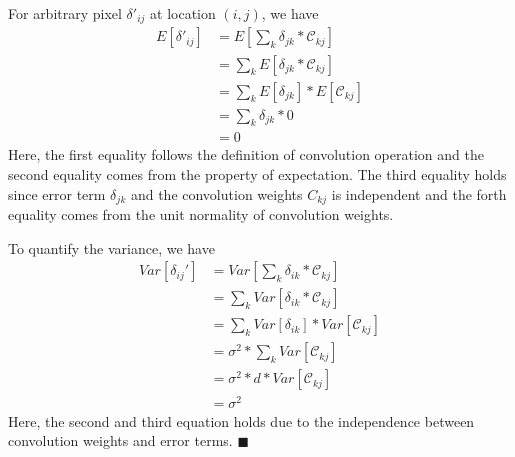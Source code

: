 \documentclass[titlepage]{article}
\newcommand*{\QEDA}{\hfill\ensuremath{\blacksquare}}
\begin{document}
For arbitrary pixel $\delta'_{ij}$ at location $(i,j)$, we have 
\begin{equation}
    \begin{aligned}
        E [\mathcal{\delta'}_{ij}] &= E [\sum_{k}\mathcal{\delta}_{jk} * \mathcal{C}_{kj}] \\
                                 &= \sum_{k} E [\mathcal{\delta}_{jk} * \mathcal{C}_{kj}] \\ 
                                 &= \sum_{k} E [\mathcal{\delta}_{jk}] * E[\mathcal{C}_{kj}] \\ 
                                 & = \sum_{k} \mathcal{\delta}_{jk} * 0\\
                                        &= 0
    \end{aligned}
\end{equation}
Here, the first equality follows the definition of convolution operation and the second equality comes from the property of expectation. The third equality holds since error term $\delta_{jk}$ and the convolution weights $C_{kj}$ is independent and the forth equality comes from the unit normality of convolution weights.

To quantify the variance, we have
\begin{equation}
    \begin{aligned}
        Var[\mathcal{\delta}_{ij}'] &= Var[ \sum_{k}\mathcal{\delta}_{ik} * \mathcal{C}_{kj} ]\\
        &= \sum_{k} Var[\mathcal{\delta}_{ik} * \mathcal{C}_{kj} ]\\
        &= \sum_{k} Var[\mathcal{\delta}_{ik}] * Var[\mathcal{C}_{kj} ]\\
        & = \sigma^2 * \sum_{k} Var[ \mathcal{C}_{kj} ]\\
        & = \sigma^2 * d * Var[\mathcal{C}_{kj}]\\
        &= \sigma^2
    \end{aligned}
\end{equation}
Here, the second and third equation holds due to the independence between convolution weights and error terms.
 \QEDA\\




\end{document}

